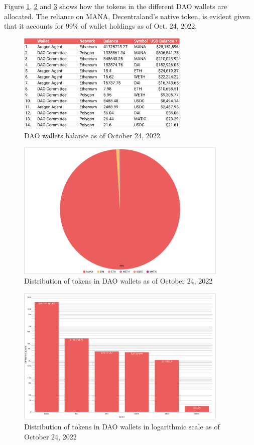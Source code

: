 \documentclass[MSE,Master,english]{twbook}%
\begin{document}
Figure \ref{fig:dao_balance}, \ref{fig:token_distribution} and \ref{fig:token_distribution_log} shows how the tokens in the different \gls{DAO} wallets are allocated. The reliance on \gls{MANA}, Decentraland's native token, is evident given that it accounts for 99\% of wallet holdings as of Oct. 24, 2022.
\begin{figure}[H]
  \centering
  \includegraphics[width=0.73\textwidth]{metrics/dao_balance.png}
  \caption{DAO wallets balance as of October 24, 2022}
  \label{fig:dao_balance}
\end{figure}
\begin{figure}[H]
  \centering
  \includegraphics[width=0.9\textwidth]{metrics/token_distribution.png}
  \caption{Distribution of tokens in \gls{DAO} wallets as of October 24, 2022}
  \label{fig:token_distribution}
\end{figure}
\begin{figure}[H]
  \centering
  \includegraphics[width=0.9\textwidth]{metrics/token_distribution_log.png}
  \caption{Distribution of tokens in \gls{DAO} wallets in logarithmic scale as of October 24, 2022}
  \label{fig:token_distribution_log}
\end{figure}
\end{document}
